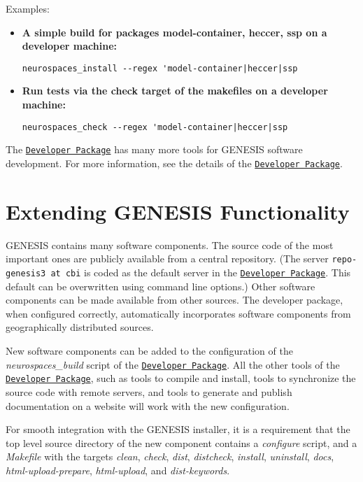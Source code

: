 \documentclass[12pt]{article}
\begin{document}
Examples:

\begin{itemize}

\item {\bf A simple build for packages model-container, heccer, ssp on a developer machine:}
\begin{verbatim}
neurospaces_install --regex 'model-container|heccer|ssp
\end{verbatim}

\item {\bf Run tests via the check target of the makefiles on a developer machine:}
\begin{verbatim}
neurospaces_check --regex 'model-container|heccer|ssp
\end{verbatim}
\end{itemize}

The \href{../developer-package/developer-package.tex}{\tt Developer
  Package} has many more tools for GENESIS software development.  For
more information, see the details of the
\href{../developer-package/developer-package.tex}{\tt Developer
  Package}.

\section*{Extending GENESIS Functionality}

GENESIS contains many software components. The source code of the most
important ones are publicly available from a central repository. (The
server {\tt repo-genesis3 at cbi} is coded as the default server in
the \href{../developer-package/developer-package.tex}{\tt Developer
  Package}. This default can be overwritten using command line
options.) Other software components can be made available from other
sources. The developer package, when configured correctly,
automatically incorporates software components from geographically
distributed sources.

New software components can be added to the configuration of the {\it
  neurospaces\_build} script of the
\href{../developer-package/developer-package.tex}{\tt Developer
  Package}. All the other tools of the
\href{../developer-package/developer-package.tex}{\tt Developer
  Package}, such as tools to compile and install, tools to synchronize
the source code with remote servers, and tools to generate and publish
documentation on a website will work with the new configuration.

For smooth integration with the GENESIS installer, it is a requirement that the top level source directory of the new component contains a {\it configure} script, and a {\it Makefile} with the targets {\it clean}, {\it check}, {\it dist}, {\it distcheck}, {\it install}, {\it uninstall}, {\it docs}, {\it html-upload-prepare}, {\it html-upload}, and {\it dist-keywords}.
\end{document}
